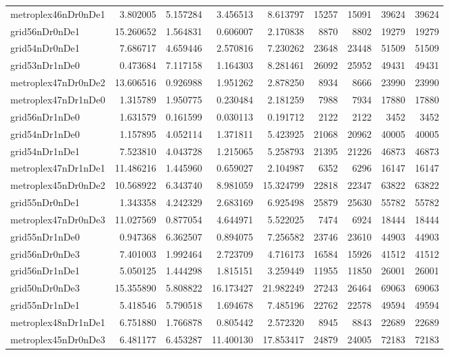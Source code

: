 \begin{longtable}{|l|r|r|r|r|r|r|r|r|}
metroplex46nDr0nDe1 & 3.802005 & 5.157284 & 3.456513 & 8.613797 & 15257 & 15091 & 39624 & 39624 \\
grid56nDr0nDe1 & 15.260652 & 1.564831 & 0.606007 & 2.170838 & 8870 & 8802 & 19279 & 19279 \\
grid54nDr0nDe1 & 7.686717 & 4.659446 & 2.570816 & 7.230262 & 23648 & 23448 & 51509 & 51509 \\
grid53nDr1nDe0 & 0.473684 & 7.117158 & 1.164303 & 8.281461 & 26092 & 25952 & 49431 & 49431 \\
metroplex47nDr0nDe2 & 13.606516 & 0.926988 & 1.951262 & 2.878250 & 8934 & 8666 & 23990 & 23990 \\
metroplex47nDr1nDe0 & 1.315789 & 1.950775 & 0.230484 & 2.181259 & 7988 & 7934 & 17880 & 17880 \\
grid56nDr1nDe0 & 1.631579 & 0.161599 & 0.030113 & 0.191712 & 2122 & 2122 & 3452 & 3452 \\
grid54nDr1nDe0 & 1.157895 & 4.052114 & 1.371811 & 5.423925 & 21068 & 20962 & 40005 & 40005 \\
grid54nDr1nDe1 & 7.523810 & 4.043728 & 1.215065 & 5.258793 & 21395 & 21226 & 46873 & 46873 \\
metroplex47nDr1nDe1 & 11.486216 & 1.445960 & 0.659027 & 2.104987 & 6352 & 6296 & 16147 & 16147 \\
metroplex45nDr0nDe2 & 10.568922 & 6.343740 & 8.981059 & 15.324799 & 22818 & 22347 & 63822 & 63822 \\
grid55nDr0nDe1 & 1.343358 & 4.242329 & 2.683169 & 6.925498 & 25879 & 25630 & 55782 & 55782 \\
metroplex47nDr0nDe3 & 11.027569 & 0.877054 & 4.644971 & 5.522025 & 7474 & 6924 & 18444 & 18444 \\
grid55nDr1nDe0 & 0.947368 & 6.362507 & 0.894075 & 7.256582 & 23746 & 23610 & 44903 & 44903 \\
grid56nDr0nDe3 & 7.401003 & 1.992464 & 2.723709 & 4.716173 & 16584 & 15926 & 41512 & 41512 \\
grid56nDr1nDe1 & 5.050125 & 1.444298 & 1.815151 & 3.259449 & 11955 & 11850 & 26001 & 26001 \\
grid50nDr0nDe3 & 15.355890 & 5.808822 & 16.173427 & 21.982249 & 27243 & 26464 & 69063 & 69063 \\
grid55nDr1nDe1 & 5.418546 & 5.790518 & 1.694678 & 7.485196 & 22762 & 22578 & 49594 & 49594 \\
metroplex48nDr1nDe1 & 6.751880 & 1.766878 & 0.805442 & 2.572320 & 8945 & 8843 & 22689 & 22689 \\
metroplex45nDr0nDe3 & 6.481177 & 6.453287 & 11.400130 & 17.853417 & 24879 & 24005 & 72183 & 72183 \\

\end{longtable}
